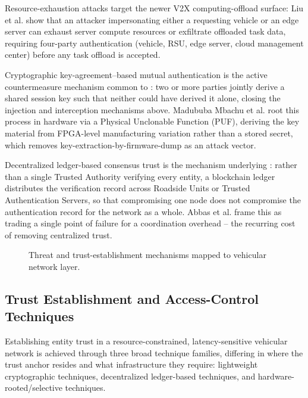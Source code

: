 \documentclass[journal]{IEEEtran}
\begin{document}
	Resource-exhaustion attacks target the newer V2X computing-offload
	surface: Liu et al. \cite{ref14} show that an attacker impersonating
	either a requesting vehicle or an edge server can exhaust server
	compute resources or exfiltrate offloaded task data, requiring
	four-party authentication (vehicle, RSU, edge server, cloud management
	center) before any task offload is accepted.
	
	Cryptographic key-agreement--based mutual authentication is the active
	countermeasure mechanism common to \cite{ref13,ref14,ref15,ref22}: two
	or more parties jointly derive a shared session key such that neither
	could have derived it alone, closing the injection and interception
	mechanisms above. Madububa Mbachu et al. \cite{ref22} root this process
	in hardware via a Physical Unclonable Function (PUF), deriving the key
	material from FPGA-level manufacturing variation rather than a stored
	secret, which removes key-extraction-by-firmware-dump as an attack
	vector.
	
	Decentralized ledger-based consensus trust is the mechanism underlying
	\cite{ref16,ref17,ref18,ref19,ref20}: rather than a single Trusted
	Authority verifying every entity, a blockchain ledger distributes the
	verification record across Roadside Units or Trusted Authentication
	Servers, so that compromising one node does not compromise the
	authentication record for the network as a whole. Abbas et al.
	\cite{ref16} frame this as trading a single point of failure for a
	coordination overhead -- the recurring cost of removing centralized
	trust.
	
	\begin{figure}[t]
		\centering
		\caption{Threat and trust-establishment mechanisms mapped to
			vehicular network layer.}
		\label{fig:mechanisms}
	\end{figure}
	
	\subsection{Trust Establishment and Access-Control Techniques}
	
	Establishing entity trust in a resource-constrained, latency-sensitive
	vehicular network is achieved through three broad technique families,
	differing in where the trust anchor resides and what infrastructure
	they require: lightweight cryptographic techniques, decentralized
	ledger-based techniques, and hardware-rooted/selective techniques.
	
\end{document}
